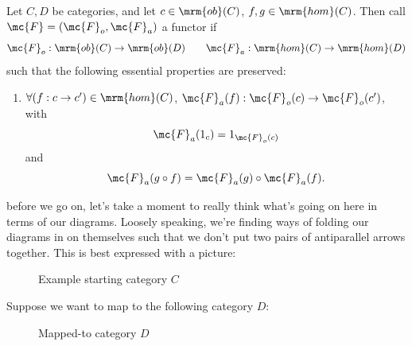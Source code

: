 \documentclass{fkbook}
\newcommand{\ob}{\mrm{ob}}
\newcommand{\homm}{\mrm{hom}}
\begin{document}
\begin{definition}[Functor]
  Let $C, D$ be categories, and let $c \in \ob(C)$, $f,g \in
  \homm(C)$. Then call $\mc{F} = (\mc{F}_o, \mc{F}_a)$ a functor if
  \[
    \mc{F}_o : \ob(C) \to \ob(D) \qquad \mc{F}_a : \homm(C) \to
    \homm(D)
  \]
  such that the following essential properties are preserved:
  \begin{enumerate}
    \item $\forall (f : c \to c') \in \homm(C)$, $\mc{F}_a(f) :
      \mc{F}_o(c) \to \mc{F}_o(c')$, with
      \[
        \mc{F}_a(1_{c}) = 1_{\mc{F}_o(c)}
      \]
      and
      \[
        \mc{F}_a(g \circ f) = \mc{F}_a(g) \circ \mc{F}_a(f).
      \]
  \end{enumerate}
\end{definition}
before we go on, let's take a moment to really think what's going on
here in terms of our diagrams. Loosely speaking, we're finding ways of
folding our diagrams in on themselves such that we don't put two pairs
of antiparallel arrows together. This is best expressed with a
picture:
\begin{figure}[H]
  \centering
  \caption{Example starting category $C$}
\end{figure}
Suppose we want to map to the following category $D$:
\begin{figure}[H]
  \centering
  \caption{Mapped-to category $D$}
\end{figure}
\end{document}

